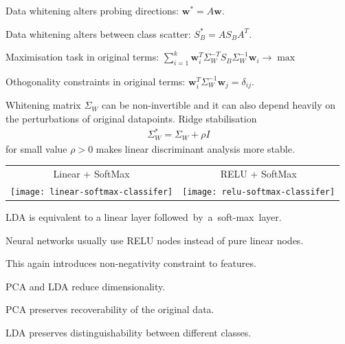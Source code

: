 \documentclass[landscape,footrule]{foils}
\renewcommand{\vec}[1]{\boldsymbol{#1}}
\begin{document}
\begin{triangles}
\item Data whitening alters probing directions: $\vec{w}^*=A\vec{w}$. 
\item Data whitening alters between class scatter: $S_B^*=AS_BA^T$. 
\item Maximisation task in original terms: $\sum_{i=1}^k\vec{w}_i^T\Sigma_W^{-T}S_B\Sigma_W^{-1}\vec{w}_i\to \max$
\item Othogonality constraints in original terms: $\vec{w}_i^T\Sigma_W^{-1}\vec{w}_j=\delta_{ij}$.\vspace*{-1cm}     
\end{triangles}


Whitening matrix $\Sigma_W$ can be non-invertible and it can also depend heavily on the perturbations of original datapoints. Ridge stabilisation 
\begin{align*}
\Sigma_W^*=\Sigma_W+\rho I
\end{align*}   
for small value $\rho>0$ makes linear discriminant analysis more stable.


\begin{tabular}{cc}
Linear + SoftMax & RELU + SoftMax\\

\texttt{[image: linear-softmax-classifer]}
&\texttt{[image: relu-softmax-classifer]}\\
\end{tabular}

\begin{triangles}
\item LDA is equivalent to a linear layer \mbox{followed~by~a~soft-max~layer.}
\item Neural networks usually use RELU nodes instead of pure linear nodes.   
\item This again introduces non-negativity constraint to features. 
\end{triangles}



\begin{triangles}
\item PCA and LDA reduce dimensionality.
\item PCA preserves recoverability of the original data.
\item LDA preserves distinguishability between different classes. \vspace*{1cm}     
\end{triangles}
\end{document}
